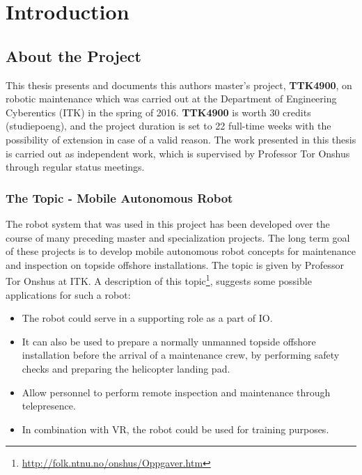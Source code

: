 \chapter{Introduction}
\label{chp:introduction} 

\section{About the Project}

This thesis presents and documents this authors master's project, \textbf{TTK4900}, on robotic maintenance which was carried out at the Department of Engineering Cyberentics (ITK) in the spring of 2016. \textbf{TTK4900} is worth 30 credits (studiepoeng), and the project duration is set to 22 full-time weeks with the possibility of extension in case of a valid reason. The work presented in this thesis is carried out as independent work, which is supervised by Professor Tor Onshus through regular status meetings.


\subsection{The Topic - Mobile Autonomous Robot}

The robot system that was used in this project has been developed over the course of many preceding master and specialization projects. The long term goal of these projects is to develop mobile autonomous robot concepts for maintenance and inspection on topside offshore installations. The topic is given by Professor Tor Onshus at \ac{ITK}. A description of this topic\footnote{\url{http://folk.ntnu.no/onshus/Oppgaver.htm}}, suggests some possible applications for such a robot: 

\begin{itemize}
	\item The robot could serve in a supporting role as a part of \ac{IO}.
	\item It can also be used to prepare a normally unmanned topside offshore installation before the arrival of a maintenance crew, by performing safety checks and preparing the helicopter landing pad.  
	\item Allow personnel to perform remote inspection and maintenance through telepresence.
	\item  In combination with \ac{VR}, the robot could be used for training purposes. 
\end{itemize}

